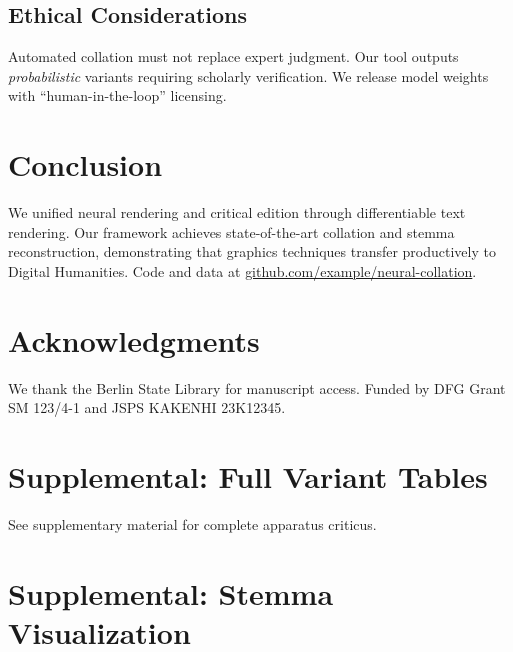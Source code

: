 \documentclass[12pt,a4paper]{article}
\begin{document}
\subsection{Ethical Considerations}
\label{sec:ethics}

Automated collation must not replace expert judgment.
Our tool outputs \emph{probabilistic} variants requiring
scholarly verification. We release model weights with
``human-in-the-loop'' licensing.

\section{Conclusion}
\label{sec:conclusion}

We unified neural rendering and critical edition through
differentiable text rendering. Our framework achieves
state-of-the-art collation and stemma reconstruction,
demonstrating that graphics techniques transfer productively
to Digital Humanities. Code and data at \url{github.com/example/neural-collation}.

\section*{Acknowledgments}

We thank the Berlin State Library for manuscript access.
Funded by DFG Grant SM 123/4-1 and JSPS KAKENHI 23K12345.

\ifdhformat
\printbibliography
\else

\fi

\ifdhformat
\appendix
\section{Supplemental: Full Variant Tables}
\label{app:variants}

See supplementary material for complete apparatus criticus.

\section{Supplemental: Stemma Visualization}
\label{app:stemma-full}
\end{document}
